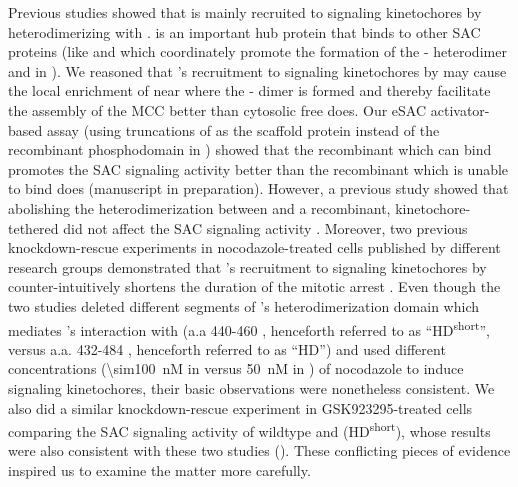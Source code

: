 Previous studies showed that  is mainly recruited to signaling kinetochores by heterodimerizing with  \cite{BubBiochem,BubR1TwoPools}.  is an important hub protein that binds to other SAC proteins (like  and  which coordinately promote the formation of the - heterodimer  and in  \cite{BUB1-CDC20-MAD1,Tripartite}). We reasoned that 's recruitment to signaling kinetochores by  may cause the local enrichment of  near where the - dimer is formed and thereby facilitate the assembly of the MCC better than cytosolic free  does. Our eSAC activator-based assay (using truncations of  as the scaffold protein instead of the recombinant  phosphodomain in ) showed that the recombinant  which can bind  promotes the SAC signaling activity better than the recombinant  which is unable to bind  does (manuscript in preparation). However, a previous study showed that %
abolishing the heterodimerization between  and a recombinant, kinetochore-tethered  did not affect the SAC signaling activity \cite{MIS12-BUB1-E252K}. Moreover, two previous  knockdown-rescue experiments in nocodazole-treated cells published by different research groups demonstrated that 's recruitment to signaling kinetochores by  counter-intuitively shortens the duration of the mitotic arrest \cite{BubR1TwoPools,BubBiochem}. Even though the two studies deleted different segments of 's heterodimerization domain which mediates 's interaction with  (a.a 440-460 \cite{BubR1TwoPools}, henceforth referred to as ``HD\textsuperscript{short}'', versus a.a. \textDelta{}432-484 \cite{BubBiochem}, henceforth referred to as ``HD'') and used different concentrations (\SI{\sim100}{nM} in \cite{BubR1TwoPools} versus \SI{50}{nM} in \cite{BubBiochem}) of nocodazole to induce signaling kinetochores, their basic observations were nonetheless consistent. We also did a similar knockdown-rescue experiment in GSK923295-treated cells comparing the SAC signaling activity of wildtype  and (\textDelta{}HD\textsuperscript{short}), whose results were also consistent with these two studies (). These conflicting pieces of evidence inspired us to examine the matter more carefully.

